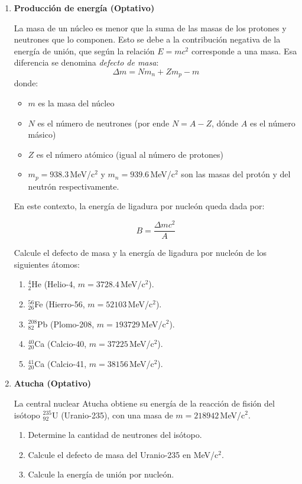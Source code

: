 \documentclass[a4paper,12pt]{article}
\begin{document}
\begin{enumerate}
\item{\bf{Producción de energía (Optativo)}}

La masa de un núcleo es menor que la suma de las masas de los protones y neutrones que lo componen. Esto se debe a la contribución negativa de la energía de unión, que según la relación $E=mc^2$ corresponde a una masa. Esa diferencia se denomina {\emph{defecto de masa}}:
\[ \Delta m = N m_n + Z m_p - m\]
donde:
\begin{itemize}
\item $m$ es la masa del núcleo
\item $N$ es el número de neutrones (por ende $N=A-Z$, dónde $A$ es el número másico)
\item $Z$ es el número atómico (igual al número de protones)
\item $m_p = 938.3$\,MeV/c$^2$ y $m_n = 939.6$\,MeV/c$^2$ son las masas del protón y del neutrón respectivamente.
\end{itemize}

En este contexto, la energía de ligadura por nucleón queda dada por: 

\[ B = \frac{\Delta m c^2}{A} \]

Calcule el defecto de masa y la energía de ligadura por nucleón de los siguientes átomos:
\begin{enumerate}
\item $^4_2$He (Helio-4, $m=3728.4$\,MeV/c$^2$).
\item $^{56}_{26}$Fe (Hierro-56, $m=52103$\,MeV/c$^2$).
\item $^{208}_{82}$Pb (Plomo-208, $m=193729$\,MeV/c$^2$).
\item $^{40}_{20}$Ca (Calcio-40, $m=37225$\,MeV/c$^2$).
\item $^{41}_{20}$Ca (Calcio-41, $m=38156$\,MeV/c$^2$).
\end{enumerate}

\item {\bf{Atucha (Optativo)}}

La central nuclear Atucha obtiene su energía de la reacción de fisión del isótopo $^{235}_{92}$U (Uranio-235), con una masa de $m=218942$\,MeV/c$^2$.

\begin{enumerate}
\item Determine la cantidad de neutrones del isótopo.
\item Calcule el defecto de masa del Uranio-235 en MeV/c$^2$.
\item Calcule la energía de unión por nucleón.
\end{enumerate}

\end{enumerate}
\end{document}
